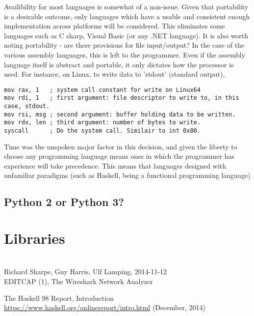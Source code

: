 \documentclass[10pt,a4paper]{report}
\begin{document}
Availibility for most languages is somewhat of a non-issue. Given that portability is a desirable outcome, only languages which have a usable and consistent enough implementation across platforms will be considered. This eliminates some languages such as C sharp, Visual Basic (or any .NET language).
It is also worth noting portability - are there provisions for file input/output? In the case of the various assembly languages, this is left to the programmer. Even if the assembly language itself is abstract and portable, it only dictates how the processor is used. For instance, on Linux, to write data to 'stdout' (standard output),

\begin{lstlisting}[language={[x64]Assembler}]
mov rax, 1   ; system call constant for write on Linux64
mov rdi, 1   ; first argument: file descriptor to write to, in this case, stdout.
mov rsi, msg ; second argument: buffer holding data to be written.
mov rdx, len ; third argument: number of bytes to write.
syscall      ; Do the system call. Similair to int 0x80.
\end{lstlisting}

Time was the unspoken major factor in this decision, and given the liberty to choose any programming language means ones in which the programmer has experience will take precedence. This means that languages designed with unfamiliar paradigms (such as Haskell, being a functional programming language\cite{haskfunc})

\subsection{Python 2 or Python 3?}

\section{Libraries}
\section{}

\begin{thebibliography}{99}
    Richard Sharpe, Guy Harris, Ulf Lamping, 2014-11-12\\
    EDITCAP (1), The Wireshark Network Analyzer

    The Haskell 98 Report, Introduction\\
    
    \url{https://www.haskell.org/onlinereport/intro.html} (December, 2014)

\end{thebibliography}
\end{document}
